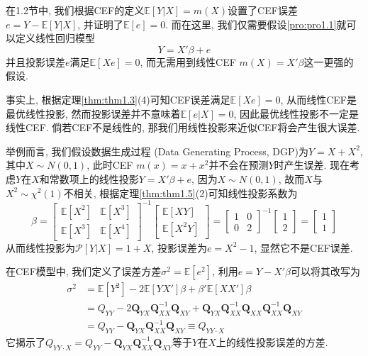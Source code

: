 \documentclass[cn, 12pt, math=mtpro2, bibstyle=apa, blue, twocol]{elegantbook}
\newcommand{\E}{\mathbb{E}}
\newcommand{\Q}{\mathbold{Q}}
\begin{document}
\begin{remark}
在1.2节中, 我们根据CEF的定义$\E[Y|X]=m(X)$设置了CEF误差$e=Y-\E[Y|X]$, 并证明了$\E[e]=0$. 而在这里, 我们仅需要假设\ref{pro:pro1.1}就可以定义线性回归模型
$$Y=X'\beta+e$$
并且投影误差$e$满足$\E[Xe]=0$, 而无需用到线性CEF $m(X)=X'\beta$这一更强的假设.

事实上, 根据定理\ref{thm:thm1.3}(4)可知CEF误差满足$\E[Xe]=0$, 从而线性CEF是最优线性投影, 然而投影误差并不意味着$\E[e|X]=0$, 因此最优线性投影不一定是线性CEF. 倘若CEF不是线性的, 那我们用线性投影来近似CEF将会产生很大误差.

举例而言, 我们假设数据生成过程 (Data Generating Process, DGP)为$Y=X+X^2$, 其中$X\sim N(0,1)$, 此时CEF $m(x)=x+x^2$并不会在预测$Y$时产生误差. 现在考虑$Y$在$X$和常数项上的线性投影$Y=X'\beta+e$, 因为$X\sim N(0,1)$, 故而$X$与$X^2\sim \chi^2(1)$不相关, 根据定理\ref{thm:thm1.5}(2)可知线性投影系数为
$$\beta=\begin{bmatrix}
          \E[X^2] & \E[X^3] \\
          \E[X^3] & \E[X^4]
        \end{bmatrix}^{-1}\begin{bmatrix}
                            \E[XY] \\
                            \E[X^2Y]
                          \end{bmatrix}=\begin{bmatrix}
                     1 & 0 \\
                     0 & 2
                   \end{bmatrix}^{-1}\begin{bmatrix}
                                       1 \\
                                       2
                                     \end{bmatrix}=\begin{bmatrix}
                                                     1 \\
                                                     1
                                                   \end{bmatrix}$$
从而线性投影为$\mathscr{P}[Y|X]=1+X$, 投影误差为$e=X^2-1$, 显然它不是CEF误差.
\end{remark}
在CEF模型中, 我们定义了误差方差$\sigma^2=\E[e^2]$, 利用$e=Y-X'\beta$可以将其改写为
\begin{align*}
\sigma^2&=\E[Y^2]-2\E[YX']\beta+\beta'\E[XX']\beta \\
&=Q_{YY}-2\Q_{YX}\Q_{XX}^{-1}\Q_{XY}+\Q_{YX}\Q_{XX}^{-1}\Q_{XX}\Q_{XX}^{-1}\Q_{XY}\\
&=Q_{YY}-\Q_{YX}\Q_{XX}^{-1}\Q_{XY}\equiv Q_{YY\cdot X}
\end{align*}
它揭示了$Q_{YY\cdot X}=Q_{YY}-\Q_{YX}\Q_{XX}^{-1}\Q_{XY}$等于$Y$在$X$上的线性投影误差的方差.
\end{document}
